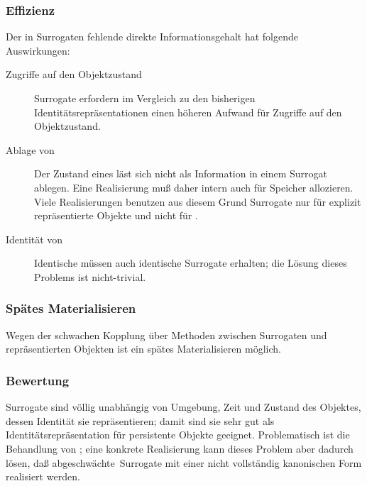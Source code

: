 \subsubsection{Effizienz}
%
Der in Surrogaten fehlende direkte Informationsgehalt hat folgende
Auswirkungen:
%
\begin{description}
%
\item[Zugriffe auf den Objektzustand] Surrogate erfordern im
Vergleich zu den bisherigen
Iden\-ti\-t\"{a}ts\-re\-pr\"{a}\-sen\-ta\-tio\-nen einen h\"{o}heren Aufwand
f\"{u}r Zugriffe auf den Objektzustand.
%
\item[{Ablage von \immval[s]}] Der Zustand eines \immval[s]\/ l\"{a}st
sich nicht als Information in einem Surrogat ablegen. Eine Realisierung
mu\ss{} daher intern auch f\"{u}r \immval[s]\/ Speicher allozieren.
Viele Realisierungen benutzen aus diesem Grund Surrogate nur
f\"{u}r explizit repr\"{a}sentierte Objekte und nicht f\"{u}r \immval[s].
%
\item[{Identit\"{a}t von \immval[s]}] Identische \immval[s]\/ m\"{u}ssen auch
identische Surrogate erhalten; die L\"{o}sung dieses Problems ist
nicht-trivial.
%
\end{description}
%
\subsubsection{Sp\"{a}tes Materialisieren}
%
Wegen der schwachen Kopplung \"{u}ber Methoden zwischen Surrogaten und
repr\"{a}sentierten Objekten ist ein sp\"{a}tes Materialisieren m\"{o}glich.
%
\subsubsection{Bewertung}
%
Surrogate sind v\"{o}llig unabh\"{a}ngig von Umgebung, Zeit und Zustand des
Objektes, dessen Identit\"{a}t sie repr\"{a}sentieren; damit sind sie sehr
gut als Identit\"{a}tsrepr\"{a}sentation f\"{u}r persistente Objekte
geeignet. Problematisch ist die Behandlung von \immval[s]; eine
konkrete Realisierung kann dieses Problem aber dadurch l\"{o}sen, da\ss{}
\rglq{}abgeschw\"{a}chte\rgrq\ Surrogate mit einer nicht vollst\"{a}ndig
kanonischen Form realisiert werden.
%
